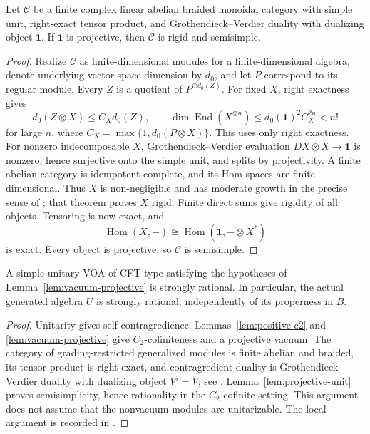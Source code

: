 \begin{lemma}
\label{lem:projective-unit}
Let $\mathcal C$ be a finite complex linear abelian braided monoidal
category with simple unit, right-exact tensor product, and
Grothendieck--Verdier duality with dualizing object $\mathbf1$.
If $\mathbf1$ is projective, then $\mathcal C$ is rigid and semisimple.
\end{lemma}
\begin{proof}
Realize $\mathcal C$ as
finite-dimensional modules for a finite-dimensional algebra, denote
underlying vector-space dimension by $d_0$, and let $P$ correspond to
its regular module. Every $Z$ is a quotient of $P^{\oplus d_0(Z)}$.
For fixed $X$, right exactness gives
\[
 d_0(Z\otimes X)\le C_Xd_0(Z),\qquad
 \dim\operatorname{End}(X^{\otimes n})
 \le d_0(\mathbf1)^2C_X^{2n}<n!
\]
for large $n$, where $C_X=\max\{1,d_0(P\otimes X)\}$.
This uses only right exactness. For nonzero indecomposable $X$,
Grothendieck--Verdier evaluation
$DX\otimes X\to\mathbf1$ is nonzero, hence surjective onto the simple
unit, and splits by projectivity. A finite abelian category is
idempotent complete, and its Hom spaces are finite-dimensional.
Thus $X$ is non-negligible and has moderate growth in the precise
sense of \cite[Theorem~1.1]{EP}; that theorem proves $X$ rigid.
Finite direct sums give
rigidity of all objects. Tensoring is now exact, and
\[
 \operatorname{Hom}(X,-)
 \cong\operatorname{Hom}(\mathbf1,-\otimes X^*)
\]
is exact. Every object is projective, so $\mathcal C$ is semisimple.
\end{proof}

\begin{theorem}
\label{thm:positive-stress-rationality}
A simple unitary VOA of CFT type satisfying the hypotheses of
Lemma~\ref{lem:vacuum-projective} is strongly rational. In particular,
the actual generated algebra $U$ is strongly rational, independently
of its properness in $B$.
\end{theorem}
\begin{proof}
Unitarity gives self-contragredience. Lemmas~\ref{lem:positive-c2} and
\ref{lem:vacuum-projective} give $C_2$-cofiniteness and a projective
vacuum. The category of grading-restricted generalized modules is
finite abelian and braided, its tensor product is right exact, and
contragredient duality is Grothendieck--Verdier duality with dualizing
object $V'=V$; see \cite[Sections~2.3 and~3]{McRae}.
Lemma~\ref{lem:projective-unit} proves semisimplicity, hence rationality
in the $C_2$-cofinite setting. This argument does not assume that the
nonvacuum modules are unitarizable.
The local argument is recorded in
.
\end{proof}


